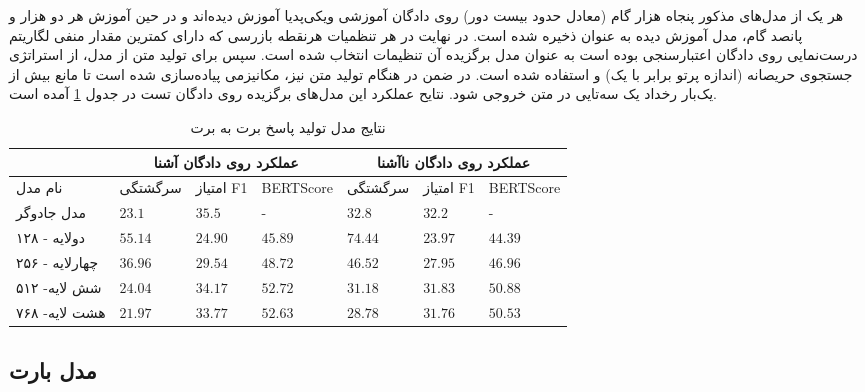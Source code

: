 هر یک از مدل‌های مذکور پنجاه هزار گام (معادل حدود بیست دور) روی دادگان آموزشی ویکی‌پدیا آموزش دیده‌اند و در حین آموزش هر دو هزار و پانصد گام، مدل آموزش دیده به عنوان 
ذخیره شده است. در نهایت  در هر تنظمیات  هرنقطه‌ بازرسی که دارای کمترین مقدار منفی لگاریتم درست‌نمایی روی دادگان اعتبارسنجی بوده است به عنوان مدل برگزیده آن تنظیمات انتخاب شده است. سپس برای تولید متن از مدل، از استراتژی
جستجوی حریصانه (اندازه پرتو برابر با یک)  و  
استفاده شده است.  در ضمن در هنگام تولید متن نیز، مکانیزمی پیاده‌سازی شده است تا مانع بیش از یک‌بار رخداد یک سه‌تایی در متن خروجی شود. 
نتایح عملکرد این مدل‌های برگزیده روی دادگان تست در جدول 
\ref{table:generation:bert2bert:beam1}
 آمده است.
\begin{table}[htb]
	\caption{ نتایج مدل تولید پاسخ برت به برت}
	\label{table:generation:bert2bert:beam1}
	\begin{tabular}{|l|l|l|l|l|l|l|}
		\hline
		& \multicolumn{3}{c|}{عملکرد روی دادگان آشنا} & \multicolumn{3}{c|}{عملکرد روی دادگان نا‌آشنا} \\ \hline
		نام مدل        & سرگشتگی     & امتیاز F1     & BERTScore     & سرگشتگی      & امتیاز F1      & BERTScore      \\ \hline
		مدل جادوگر     & $23.1$      & $35.5$        & -             & $32.8$       & $32.2$         & -              \\ \hline
		دولایه - ۱۲۸   & $55.14$     & $24.90$       & $45.89$       & $74.44$      & $23.97$        & $44.39$        \\ \hline
		چهارلایه - ۲۵۶ & $36.96$     & $29.54$       & $48.72$       & $46.52$      & $27.95$        & $46.96$        \\ \hline
		شش لایه- ۵۱۲   & $24.04$     & $34.17$       & $52.72$       & $31.18$      & $31.83$        & $50.88$        \\ \hline
		هشت لایه- ۷۶۸  & $21.97$     & $33.77$       & $52.63$       & $28.78$      & $31.76$        & $50.53$        \\ \hline
	\end{tabular}
\end{table}


\subsection{مدل بارت}


